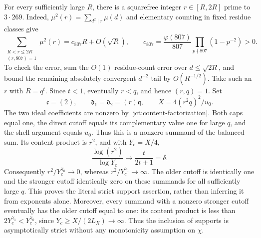 For every sufficiently large \(R\), there is a squarefree integer
\(r\in[R,2R]\) prime to \(3\cdot269\). Indeed,
\(\mu^2(r)=\sum_{d^2\mid r}\mu(d)\) and elementary counting in
fixed residue classes give
\[
 \sum_{\substack{R<r\le2R\\(r,807)=1}}\mu^2(r)
 =c_{807}R+O(\sqrt R),\qquad
 c_{807}=\frac{\varphi(807)}{807}
         \prod_{p\nmid807}(1-p^{-2})>0.
\]
To check the error, sum the \(O(1)\) residue-count error over
\(d\le\sqrt{2R}\), and bound the remaining absolutely convergent
\(d^{-2}\) tail by \(O(R^{-1/2})\).
Take such an \(r\) with \(R=q^t\). Since \(t<1\), eventually
\(r<q\), and hence \((r,q)=1\).
Set
\[
 \mathfrak c=(2),\qquad
 \mathfrak d_1=\mathfrak d_2=(r)\mathfrak q,
 \qquad X=4(r^2q)^2/u_0.
\]
The two ideal coefficients are nonzero by
\eqref{jct:content-factorization}. Both caps equal one, the direct
cutoff equals its complementary value one for large \(q\), and
the shell argument equals \(u_0\). Thus this is a nonzero summand
of the balanced sum. Its content product is \(r^2\), and with
\(Y_c=X/4\),
\[
 \frac{\log(r^2)}{\log Y_c}\longrightarrow
 \frac{t}{2t+1}=\delta.
\]
Consequently \(r^2/Y_c^{\gamma_0}\to0\), whereas
\(r^2/Y_c^{\gamma_1}\to\infty\). The older cutoff is identically
one and the stronger cutoff identically zero on these summands
for all sufficiently large \(q\). This proves the literal strict
support assertion, rather than inferring it from exponents alone.
Moreover, every summand with a nonzero stronger cutoff eventually
has the older cutoff equal to one: its content product is less than
\(2Y_c^{\gamma_1}<Y_c^{\gamma_0}\), since
\(Y_c\ge X/(2L_X)\to\infty\). Thus the inclusion of supports
is asymptotically strict without any monotonicity assumption on
\(\chi\).

